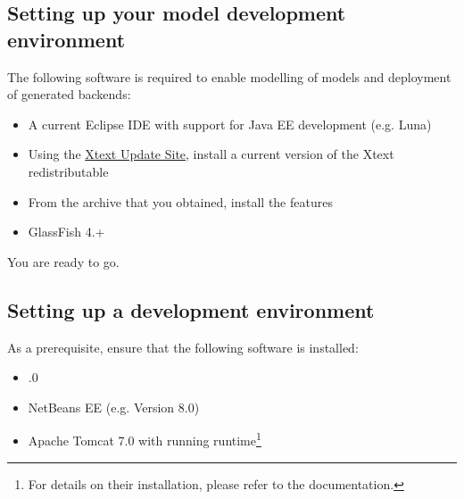 
\subsection{Setting up your \MD model development environment}

The following software is required to enable modelling of \MD models and deployment of generated backends:

\begin{itemize}
\item A current Eclipse IDE with support for Java EE development (e.g. Luna)
\item Using the \href{https://eclipse.org/Xtext/download.html}{Xtext Update Site}, install a current version of the Xtext redistributable
\item From the archive that you obtained, install the \MD features
\item GlassFish 4.+
\end{itemize}

You are ready to go.


\subsection{Setting up a \mapapps development environment}
\label{subsec:basic-setup}

As a prerequisite, ensure that the following software is installed:

\begin{itemize}
\item {}.0
\item NetBeans EE (e.g. Version 8.0)
\item Apache Tomcat 7.0 with running \mapapps runtime\footnote{For details on their installation, please refer to the \mapapps documentation.}
\end{itemize}

